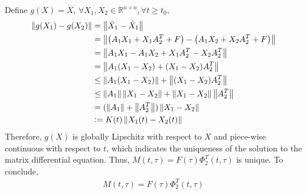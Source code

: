 \documentclass[a4paper,10.5pt]{article}
\newcommand{\R}{\mathbb{R}}
\newcommand{\defeq}{\vcentcolon=}
\newcommand{\norm}[1]{\left\lVert#1\right\rVert}
\begin{document}
Define $g(X) = \dot{X}$, $\forall X_1,X_2 \in \R^{n \times n}, \forall t \geq t_0$,
\begin{align*}
\norm{g(X_1)-g(X_2)} &= \norm{\dot{X}_1-\dot{X}_1} \\
&=\norm{\left(A_1X_1 + X_1 A^T_2 + F\right)-\left(A_1X_2 + X_2 A^T_2 + F\right)} \\
&=\norm{A_1X_1-A_1X_2+ X_1 A^T_2- X_2A^T_2} \\
&=\norm{A_1(X_1-X_2)+ (X_1-X_2)A^T_2} \\
&\leq \norm{A_1(X_1-X_2)} + \norm{(X_1-X_2)A^T_2} \\
&\leq \norm{A_1}\norm{X_1-X_2} + \norm{X_1-X_2}\norm{A^T_2} \\
&= (\norm{A_1}+\norm{A_2^T})\norm{X_1-X_2} \\
&\defeq K(t)\norm{X_1(t)-X_2(t)}
\end{align*}
Therefore, $g(X)$ is globally Lipschitz with respect to $X$ and piece-wise continuous with respect to $t$, which indicates the uniqueness of the solution to the matrix differential equation. Thus, $M(t,\tau) = F(\tau)\Phi_2^T(t,\tau)$ is unique. To conclude,
\begin{align*}
M(t,\tau) = F(\tau)\Phi_2^T(t,\tau)
\end{align*}

\clearpage

\end{document}
